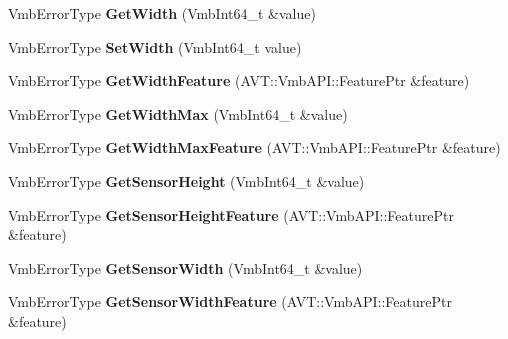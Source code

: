 \begin{DoxyCompactItemize}
\item 
\hypertarget{classMakoCamera_aba26e2b798b592ca0458754613e8868e}{Vmb\-Error\-Type {\bfseries Get\-Width} (Vmb\-Int64\-\_\-t \&value)}\label{classMakoCamera_aba26e2b798b592ca0458754613e8868e}

\item 
\hypertarget{classMakoCamera_a527b9a766e870bfd2926c31e9b4d6236}{Vmb\-Error\-Type {\bfseries Set\-Width} (Vmb\-Int64\-\_\-t value)}\label{classMakoCamera_a527b9a766e870bfd2926c31e9b4d6236}

\item 
\hypertarget{classMakoCamera_ad0a59a834514918909f2c3a159e9dca5}{Vmb\-Error\-Type {\bfseries Get\-Width\-Feature} (A\-V\-T\-::\-Vmb\-A\-P\-I\-::\-Feature\-Ptr \&feature)}\label{classMakoCamera_ad0a59a834514918909f2c3a159e9dca5}

\item 
\hypertarget{classMakoCamera_a8400a8b7d6b7778eaa3d1d26835fe046}{Vmb\-Error\-Type {\bfseries Get\-Width\-Max} (Vmb\-Int64\-\_\-t \&value)}\label{classMakoCamera_a8400a8b7d6b7778eaa3d1d26835fe046}

\item 
\hypertarget{classMakoCamera_a5b3ed88e61641d5854d33843aa5829ea}{Vmb\-Error\-Type {\bfseries Get\-Width\-Max\-Feature} (A\-V\-T\-::\-Vmb\-A\-P\-I\-::\-Feature\-Ptr \&feature)}\label{classMakoCamera_a5b3ed88e61641d5854d33843aa5829ea}

\item 
\hypertarget{classMakoCamera_a1885e67612c500c4a717908c61c5c84a}{Vmb\-Error\-Type {\bfseries Get\-Sensor\-Height} (Vmb\-Int64\-\_\-t \&value)}\label{classMakoCamera_a1885e67612c500c4a717908c61c5c84a}

\item 
\hypertarget{classMakoCamera_a564a27cf4b596cd0d70dc03cc704693a}{Vmb\-Error\-Type {\bfseries Get\-Sensor\-Height\-Feature} (A\-V\-T\-::\-Vmb\-A\-P\-I\-::\-Feature\-Ptr \&feature)}\label{classMakoCamera_a564a27cf4b596cd0d70dc03cc704693a}

\item 
\hypertarget{classMakoCamera_a70f21f78c5c8af4b14e126a513f102c8}{Vmb\-Error\-Type {\bfseries Get\-Sensor\-Width} (Vmb\-Int64\-\_\-t \&value)}\label{classMakoCamera_a70f21f78c5c8af4b14e126a513f102c8}

\item 
\hypertarget{classMakoCamera_a64cb38c04d65985144596b8d34efcbcf}{Vmb\-Error\-Type {\bfseries Get\-Sensor\-Width\-Feature} (A\-V\-T\-::\-Vmb\-A\-P\-I\-::\-Feature\-Ptr \&feature)}\label{classMakoCamera_a64cb38c04d65985144596b8d34efcbcf}


\end{DoxyCompactItemize}
